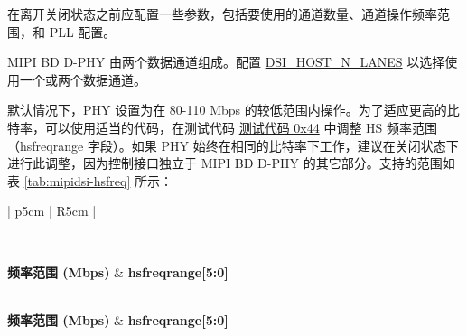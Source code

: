 \documentclass[main\_\_CN.tex]{subfiles}
\begin{document}
在离开关闭状态之前应配置一些参数，包括要使用的通道数量、通道操作频率范围，和 PLL 配置。

MIPI BD D-PHY 由两个数据通道组成。配置 \hyperref[fielddesc:DSIHOSTNLANES]{DSI\_HOST\_N\_LANES} 以选择使用一个或两个数据通道。

默认情况下，PHY 设置为在 80-110 Mbps 的较低范围内操作。为了适应更高的比特率，可以使用适当的代码，在测试代码 \hyperref[sec:test-code-0x44]{测试代码 0x44} 中调整 HS 频率范围（hsfreqrange 字段）。如果 PHY 始终在相同的比特率下工作，建议在关闭状态下进行此调整，因为控制接口独立于 MIPI BD D-PHY 的其它部分。支持的范围如表 \ref{tab:mipidsi-hsfreq} 所示：

\begin{longtable}{| p{5cm} | R{5cm} |}
    \caption{MIPI BD D-PHY 支持的频率范围} \label{tab:mipidsi-hsfreq} \\
    \hline
    
    \textbf{频率范围 (Mbps)} & \textbf{hsfreqrange[5:0]} \\ \hline
    \endfirsthead

    \\\hline
    \textbf{频率范围 (Mbps)} & \textbf{hsfreqrange[5:0]} \\ \hline
    \endhead

     \\
    \endfoot

    \endlastfoot
    

\end{longtable}
\end{document}
